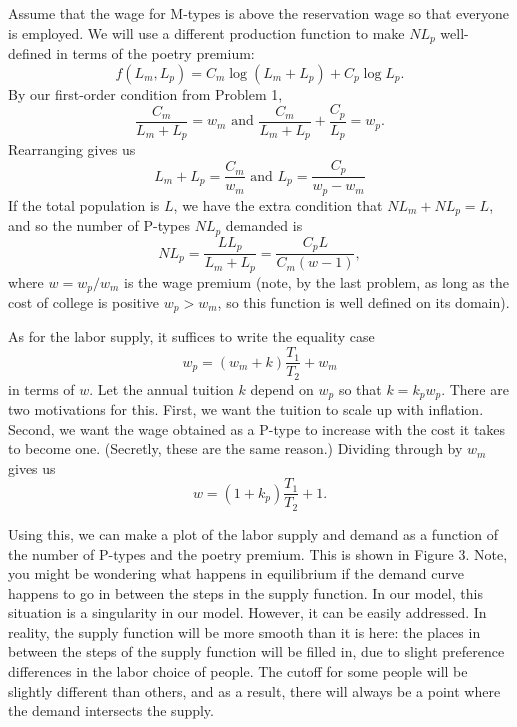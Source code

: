 \documentclass[12pt]{article}
\begin{document}
\begin{enumerate}
Assume that the wage for M-types is above the reservation wage so that everyone is employed. We will use a different production function to make $NL_p$ well-defined in terms of the poetry premium:
\[
    f(L_m, L_p) = C_m\log(L_m + L_p) + C_p\log{L_p}.
\]
By our first-order condition from Problem 1,
\[
    \frac{C_m}{L_m + L_p} = w_m \text{ and } \frac{C_m}{L_m + L_p} + \frac{C_p}{L_p} = w_p.
\]
Rearranging gives us
\[
    L_m + L_p = \frac{C_m}{w_m} \text{ and } L_p = \frac{C_p}{w_p - w_m}
\]
If the total population is $L$, we have the extra condition that $NL_m + NL_p = L$, and so the number of P-types $NL_p$ demanded is
\[
    NL_p = \frac{LL_p}{L_m + L_p} = \frac{C_pL}{C_m(w - 1)},
\]
where $w = w_p/w_m$ is the wage premium (note, by the last problem, as long as the cost of college is positive $w_p > w_m$, so this function is well defined on its domain).

As for the labor supply, it suffices to write the equality case
\[
    w_p = (w_m + k)\frac{T_1}{T_2} + w_m
\]
in terms of $w$. Let the annual tuition $k$ depend on $w_p$ so that $k = k_pw_p$. There are two motivations for this. First, we want the tuition to scale up with inflation. Second, we want the wage obtained as a P-type to increase with the cost it takes to become one. (Secretly, these are the same reason.) Dividing through by $w_m$ gives us
\[
    w = (1 + k_p)\frac{T_1}{T_2} + 1.
\]

Using this, we can make a plot of the labor supply and demand as a function of the number of P-types and the poetry premium.  This is shown in Figure 3.  Note, you might be wondering what happens in equilibrium if the demand curve happens to go in between the steps in the supply function.  In our model, this situation is a singularity in our model.  However, it can be easily addressed.  In reality, the supply function will be more smooth than it is here: the places in between the steps of the supply function will be filled in, due to slight preference differences in the labor choice of people.  The cutoff for some people will be slightly different than others, and as a result, there will always be a point where the demand intersects the supply.


\end{enumerate}
\end{document}
